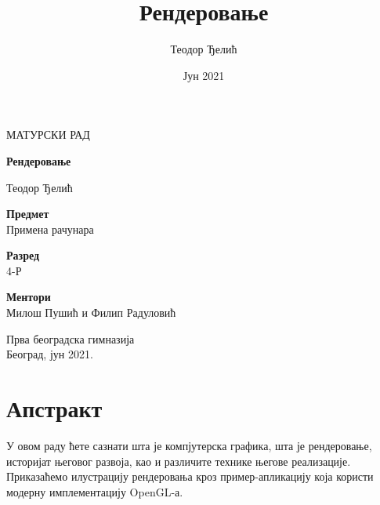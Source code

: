 \documentclass[12pt]{article}
\title{Рендеровање}
\author{Теодор Ђелић}
\date{Јун 2021}
\begin{document}
	\begin{titlepage}
		\begin{center}
			\vspace*{1cm}
			
			\LARGE
			
			МАТУРСКИ РАД\\
			
			
			\vspace{1cm}
			
			\Huge
			\textbf{Рендеровање}
			
			\vspace{0.5cm}
			
			\LARGE
			Теодор Ђелић
			
			\vspace{1cm}
			
			\Large
			\textbf{Предмет}\\
			\Large
			Примена рачунара\\
			
			\vspace{0.5cm}
			
			\Large
			\textbf{Разред}\\
			\Large
			4-Р\\
			
			\vspace{0.5cm}
			
			\Large
			\textbf{Ментори}\\
			\Large
			Милош Пушић и Филип Радуловић\\
			
			
			\vfill
			
			\vspace{0.8cm}
			
			\large
			
			Прва београдска гимназија\\
			Београд, јун 2021.\\
			
		\end{center}
	\end{titlepage}
	
	\tableofcontents
	
	\pagebreak
	
	\section*{Апстракт}
	У овом раду ћете сазнати шта је компјутерска графика, шта је рендеровање, историјат његовог развоја, као и различите технике његове реализације. Приказаћемо илустрацију рендеровања кроз пример-апликацију која користи модерну имплементацију OpenGL-а.
	
\end{document}
